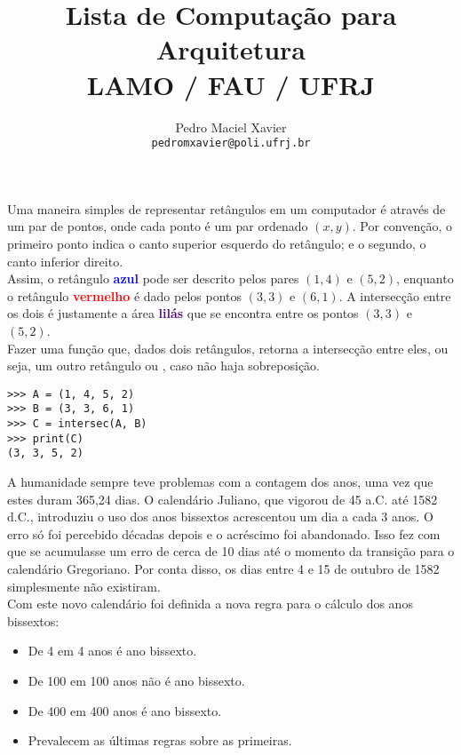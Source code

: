 \documentclass[12pt]{article}
\title{%
Lista de Computação para Arquitetura\\
{\normalsize LAMO / FAU / UFRJ}
}
\author{%
Pedro Maciel Xavier \\ 
\texttt{pedromxavier@poli.ufrj.br}
}
\begin{document}
	\maketitle
	
	
	
	
	Uma maneira simples de representar retângulos em um computador é através de um par de pontos, onde cada ponto é um par ordenado $(x, y)$. Por convenção, o primeiro ponto indica o canto superior esquerdo do retângulo; e o segundo, o canto inferior direito.\\
	
	
	
	Assim, o retângulo \textcolor{blue}{\textbf{azul}} pode ser descrito pelos pares $(1, 4)$ e $(5, 2)$, enquanto o retângulo \textcolor{red}{\textbf{vermelho}} é dado pelos pontos $(3, 3)$ e $(6, 1)$. A intersecção entre os dois é justamente a área \textcolor{indigo}{\textbf{lilás}} que se encontra entre os pontos $(3, 3)$ e $(5, 2)$. \\
	
	\quest Fazer uma função que, dados dois retângulos, retorna a intersecção entre eles, ou seja, um outro retângulo ou , caso não haja sobreposição.\\
	
	\example
	\begin{lstlisting}
>>> A = (1, 4, 5, 2)
>>> B = (3, 3, 6, 1)
>>> C = intersec(A, B)
>>> print(C)
(3, 3, 5, 2)
	\end{lstlisting}
	
	\pagebreak
	
	
	A humanidade sempre teve problemas com a contagem dos anos, uma vez que estes duram 365,24 dias. O calendário Juliano, que vigorou de 45 a.C. até 1582 d.C., introduziu o uso dos anos bissextos acrescentou um dia a cada 3 anos. O erro só foi percebido décadas depois e o acréscimo foi abandonado. Isso fez com que se acumulasse um erro de cerca de 10 dias até o momento da transição para o calendário Gregoriano. Por conta disso, os dias entre 4 e 15 de outubro de 1582 simplesmente não existiram.\\
	
	Com este novo calendário foi definida a nova regra para o cálculo dos anos bissextos:
	
	\begin{itemize}
		\item De 4 em 4 anos é ano bissexto.
		\item De 100 em 100 anos não é ano bissexto.
		\item De 400 em 400 anos é ano bissexto.
		\item Prevalecem as últimas regras sobre as primeiras.
	\end{itemize}
	
\end{document}
